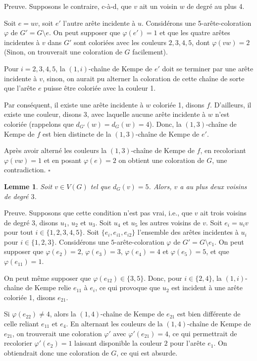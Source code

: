 \documentclass[10pt,a4paper]{article}
\newtheorem{lemme}{Lemme}
\newcommand{\ep}{{\hfill $\square$}}
\begin{document}
Preuve. 
Supposons le contraire, c-à-d, que $v$ ait un voisin $w$ de degré au plus 4.

Soit $e=uv$, soit $e'$ l'autre arête incidente à $u$.
Considérons une 5-arête-coloration $\varphi$ de $G'=G \setminus e$. On peut supposer que $\varphi(e')=1$ et que les quatre arêtes incidentes à $v$ dans $G'$ sont coloriées avec les couleurs $2,3,4,5$, dont $\varphi(vw)=2$ (Sinon, on trouverait une coloration de $G$ facilement).

Pour $i=2,3,4,5$, la $(1,i)$-chaîne de Kempe de $e'$ doit se terminer par une arête incidente à $v$, sinon, on aurait pu alterner la coloration de cette chaîne de sorte que l'arête $e$ puisse être coloriée avec la couleur 1. 

Par conséquent, il existe une arête incidente à $w$ coloriée 1, disons $f$. D'ailleurs, il existe une couleur, disons 3, avec laquelle aucune arête incidente à $w$ n'est coloriée (rappelons que $d_{G'}(w)=d_G(w)=4$). Donc, la $(1,3)$-chaîne de Kempe de $f$ est bien distincte de la $(1,3)$-chaîne de Kempe de $e'$.

Après avoir alterné les couleurs la $(1,3)$-chaîne de Kempe de $f$, en recoloriant $\varphi(vw)=1$ et en posant $\varphi(e)=2$ on obtient une coloration de $G$, une contradiction. \ep

\begin{lemme}
Soit $v \in V(G)$ tel que $d_G(v) = 5$. Alors, $v$ a au plus deux voisins de degré $3$.
\label{le:5333}
\end{lemme}


Preuve.
Supposons que cette condition n'est pas vrai, i.e., que $v$ ait trois voisins de degré 3, disons $u_1$, $u_2$ et $u_3$. Soit $u_4$ et $u_5$ les autres voisins de $v$. Soit $e_i = u_iv$ pour tout $i \in \{1,2,3,4,5\}$. Soit $\{e_i, e_{i1}, e_{i2}\}$ l'ensemble des arêtes incidentes à $u_i$ pour $i \in \{1,2,3\}$. Considérons une $5$-arête-coloration $\varphi$ de $G' = G \setminus e_1$. On peut supposer que $\varphi(e_2)=2$, $\varphi(e_3)=3$, $\varphi(e_4)=4$ et $\varphi(e_5)=5$, et que $\varphi(e_{11}) = 1$. 

On peut même supposer que $\varphi(e_{12}) \in \{3,5\}$.
Donc, pour $i \in \{2,4\}$, la $(1,i)$-chaîne de Kempe relie $e_{11}$ à $e_i$, ce qui provoque que $u_2$ est incident à une arête coloriée 1, disons $e_{21}$. 

Si $\varphi(e_{22}) \ne 4$, alors la $(1,4)$-chaîne de Kempe de $e_{21}$ est bien différente de celle reliant $e_{11}$ et $e_4$. En alternant les couleurs de la $(1,4)$-chaîne de Kempe de $e_{21}$, on trouverait une coloration $\varphi'$ avec $\varphi'(e_{21})=4$, ce qui permettrait de recolorier $\varphi'(e_2) = 1$ laissant disponible la couleur $2$ pour l'arête $e_1$. On obtiendrait donc une coloration de $G$, ce qui est absurde. 
\end{document}
